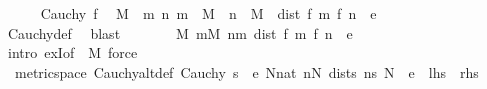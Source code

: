 \begin{isabellebody}
\ \ \ \ \isamarkupfalse%
\ {\isacartoucheopen}Cauchy\ f{\isacartoucheclose}\ \isamarkupfalse%
\ M\ \ {\isachardoublequoteopen}{\isasymAnd}m\ n{\isachardot}{\kern0pt}\ m\ {\isasymge}\ M\ {\isasymLongrightarrow}\ n\ {\isasymge}\ M\ {\isasymLongrightarrow}\ dist\ {\isacharparenleft}{\kern0pt}f\ m{\isacharparenright}{\kern0pt}\ {\isacharparenleft}{\kern0pt}f\ n{\isacharparenright}{\kern0pt}\ {\isacharless}{\kern0pt}\ e{\isachardoublequoteclose}\isanewline
\ \ \ \ \ \ \isamarkupfalse%
\ Cauchy{\isacharunderscore}{\kern0pt}def\ \isamarkupfalse%
\ blast\isanewline
\ \ \ \ \isamarkupfalse%
\ \isamarkupfalse%
\ {\isachardoublequoteopen}{\isasymexists}M{\isachardot}{\kern0pt}\ {\isasymforall}m{\isasymge}M{\isachardot}{\kern0pt}\ {\isasymforall}n{\isachargreater}{\kern0pt}m{\isachardot}{\kern0pt}\ dist\ {\isacharparenleft}{\kern0pt}f\ m{\isacharparenright}{\kern0pt}\ {\isacharparenleft}{\kern0pt}f\ n{\isacharparenright}{\kern0pt}\ {\isacharless}{\kern0pt}\ e{\isachardoublequoteclose}\isanewline
\ \ \ \ \ \ \isamarkupfalse%
\ {\isacharparenleft}{\kern0pt}intro\ exI{\isacharbrackleft}{\kern0pt}of\ {\isacharunderscore}{\kern0pt}\ M{\isacharbrackright}{\kern0pt}{\isacharparenright}{\kern0pt}\ force\isanewline
\ \ \isamarkupfalse%
\isanewline
{}\isamarkupfalse%
%
\endisatagproof
{\isafoldproof}%
%
\isadelimproof
\isanewline
%
\endisadelimproof
\isanewline
{}\isamarkupfalse%
\ {\isacharparenleft}{\kern0pt}\ metric{\isacharunderscore}{\kern0pt}space{\isacharparenright}{\kern0pt}\ Cauchy{\isacharunderscore}{\kern0pt}altdef{}{\isacharcolon}{\kern0pt}\ {\isachardoublequoteopen}Cauchy\ s\ {\isasymlongleftrightarrow}\ {\isacharparenleft}{\kern0pt}{\isasymforall}e{\isachargreater}{\kern0pt}{}{\isachardot}{\kern0pt}\ {\isasymexists}N{\isacharcolon}{\kern0pt}{\isacharcolon}{\kern0pt}nat{\isachardot}{\kern0pt}\ {\isasymforall}n{\isasymge}N{\isachardot}{\kern0pt}\ dist{\isacharparenleft}{\kern0pt}s\ n{\isacharparenright}{\kern0pt}{\isacharparenleft}{\kern0pt}s\ N{\isacharparenright}{\kern0pt}\ {\isacharless}{\kern0pt}\ e{\isacharparenright}{\kern0pt}{\isachardoublequoteclose}\ {\isacharparenleft}{\kern0pt}\ {\isachardoublequoteopen}{\isacharquery}{\kern0pt}lhs\ {\isacharequal}{\kern0pt}\ {\isacharquery}{\kern0pt}rhs{\isachardoublequoteclose}{\isacharparenright}{\kern0pt}\isanewline
%
\isadelimproof
%
\endisadelimproof
%
\isatagproof
{}\isamarkupfalse%

\end{isabellebody}
